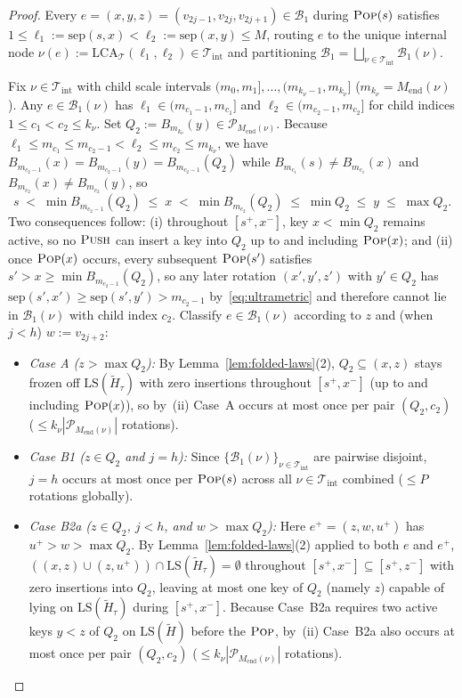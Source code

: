 \documentclass[11pt]{article}
\theoremstyle{definition}
\theoremstyle{remark}
\newcommand{\LS}{\mathrm{LS}}
\newcommand{\LCA}{\mathrm{LCA}}
\newcommand{\sep}{\mathrm{sep}}
\newcommand{\PUSH}{\textnormal{\scshape Push}}
\newcommand{\POP}{\textnormal{\scshape Pop}}
\begin{document}
\begin{proof}
Every $e = (x, y, z) = (v_{2j-1}, v_{2j}, v_{2j+1}) \in \mathcal{B}_1$ during $\POP(s)$ satisfies $1 \le \ell_1 := \sep(s, x) < \ell_2 := \sep(x, y) \le M$, routing $e$ to the unique internal node $\nu(e) := \LCA_{\mathcal{T}}(\ell_1, \ell_2) \in \mathcal{T}_{\mathrm{int}}$ and partitioning $\mathcal{B}_1 = \bigsqcup_{\nu \in \mathcal{T}_{\mathrm{int}}} \mathcal{B}_1(\nu)$.

Fix $\nu \in \mathcal{T}_{\mathrm{int}}$ with child scale intervals $(m_0, m_1], \dots, (m_{k_\nu - 1}, m_{k_\nu}]$ ($m_{k_\nu} = M_{\mathrm{end}}(\nu)$). Any $e \in \mathcal{B}_1(\nu)$ has $\ell_1 \in (m_{c_1 - 1}, m_{c_1}]$ and $\ell_2 \in (m_{c_2 - 1}, m_{c_2}]$ for child indices $1 \le c_1 < c_2 \le k_\nu$. Set $Q_2 := B_{m_{k_\nu}}(y) \in \mathcal{P}_{M_{\mathrm{end}}(\nu)}$. Because $\ell_1 \le m_{c_1} \le m_{c_2 - 1} < \ell_2 \le m_{c_2} \le m_{k_\nu}$, we have $B_{m_{c_2 - 1}}(x) = B_{m_{c_2 - 1}}(y) = B_{m_{c_2 - 1}}(Q_2)$ while $B_{m_{c_1}}(s) \ne B_{m_{c_1}}(x)$ and $B_{m_{c_2}}(x) \ne B_{m_{c_2}}(y)$, so
\[
s \;<\; \min B_{m_{c_2 - 1}}(Q_2) \;\le\; x \;<\; \min B_{m_{c_2}}(Q_2) \;\le\; \min Q_2 \;\le\; y \;\le\; \max Q_2.
\]
Two consequences follow: (i) throughout $[s^+, x^-]$, key $x < \min Q_2$ remains active, so no $\PUSH$ can insert a key into $Q_2$ up to and including $\POP(x)$; and (ii) once $\POP(x)$ occurs, every subsequent $\POP(s')$ satisfies $s' > x \ge \min B_{m_{c_2 - 1}}(Q_2)$, so any later rotation $(x', y', z')$ with $y' \in Q_2$ has $\sep(s', x') \ge \sep(s', y') > m_{c_2 - 1}$ by~\eqref{eq:ultrametric} and therefore cannot lie in $\mathcal{B}_1(\nu)$ with child index $c_2$. Classify $e \in \mathcal{B}_1(\nu)$ according to $z$ and (when $j < h$) $w := v_{2j+2}$:
\begin{itemize}[leftmargin=2em]
  \item \emph{Case A ($z > \max Q_2$):} By Lemma~\ref{lem:folded-laws}(2), $Q_2 \subseteq (x, z)$ stays frozen off $\LS(\widetilde{H}_\tau)$ with zero insertions throughout $[s^+, x^-]$ (up to and including $\POP(x)$), so by~(ii) Case~A occurs at most once per pair $(Q_2, c_2)$ ($\le k_\nu |\mathcal{P}_{M_{\mathrm{end}}(\nu)}|$ rotations).
  \item \emph{Case B1 ($z \in Q_2$ and $j = h$):} Since $\{\mathcal{B}_1(\nu)\}_{\nu \in \mathcal{T}_{\mathrm{int}}}$ are pairwise disjoint, $j = h$ occurs at most once per $\POP(s)$ across all $\nu \in \mathcal{T}_{\mathrm{int}}$ combined ($\le P$ rotations globally).
  \item \emph{Case B2a ($z \in Q_2$, $j < h$, and $w > \max Q_2$):} Here $e^+ = (z, w, u^+)$ has $u^+ > w > \max Q_2$. By Lemma~\ref{lem:folded-laws}(2) applied to both $e$ and $e^+$, $((x, z) \cup (z, u^+)) \cap \LS(\widetilde{H}_\tau) = \emptyset$ throughout $[s^+, x^-] \subseteq [s^+, z^-]$ with zero insertions into $Q_2$, leaving at most one key of $Q_2$ (namely $z$) capable of lying on $\LS(\widetilde{H}_\tau)$ during $[s^+, x^-]$. Because Case~B2a requires two active keys $y < z$ of $Q_2$ on $\LS(\widetilde{H})$ before the $\POP$, by~(ii) Case~B2a also occurs at most once per pair $(Q_2, c_2)$ ($\le k_\nu |\mathcal{P}_{M_{\mathrm{end}}(\nu)}|$ rotations).

\end{itemize}
\end{proof}
\end{document}
